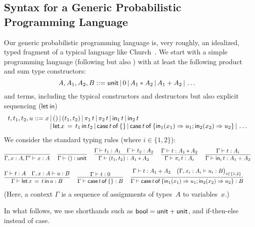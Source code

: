 \subsection{Syntax for a Generic Probabilistic Programming Language}
\label{sec:generic-ppl}
Our generic probabilistic programming language is, very roughly, an idealized,
typed fragment of a typical language like Church~\cite{goodman2008church}. 
%
We start with a simple programming language (following
\cite{s-finite,prob-cbpv,dario-thesis} but also
\cite{moggi-computational-lambda}) with at least the following product
and sum type constructors:
\[ A,A_1,A_2,B ::= \mathsf{unit} \,|\, 0\,|\, A_1 \ast A_2 \,|\, A_1+A_2\,|\, \dots 
\]
and terms, including the typical constructors and destructors but also
explicit sequencing ($\mathsf{let\,in}$)
\[\begin{array}{l@{}l}t,t_1,t_2,u ::= x &\s () \s (t_1,t_2) \s \pi_1\,t \s \pi_2\,t\s
  \inj_1\,t \s \inj_2\,t \\&\s \letin
  x {t_1} {t_2} \s\casezero t \s \case t {x_1}{u_1}{x_2}{u_2}\s \dots\end{array}
\]
We consider the standard typing rules (where $i\in\{1,2\}$):
  \begin{align*}
  &
   \infer{\Gamma, x : A, \Gamma' \vdash x : A}{} 
\ \quad   \infer{\Gamma \vdash () : \tunit}{}
  \ \quad \infer{\Gamma \vdash (t_1,t_2) : A_1 \ast A_2}{\Gamma \vdash t_1 : A_1 \quad \Gamma \vdash t_2 : A_2} 
   \ \quad \infer{\Gamma \vdash \pi_i\,t : A_i}{\Gamma \vdash t : A_1
    \ast A_2}
     \ \quad \infer{\Gamma \vdash \inj_i\,t : A_1+A_2}{\Gamma \vdash t : A_i}
   \\[6pt]
   &
     \infer{\Gamma \vdash \letin x t u : B}
     {\Gamma \vdash t : A \quad \Gamma, x : A \vdash u : B }
     \ \quad 
   \infer{\Gamma \vdash \casezero t : B}
           {\Gamma \vdash t : 0 }
     \ \quad 
   \infer{\Gamma \vdash \case t {x_1}{u_1}{x_2}{u_2}: B}
           {\Gamma \vdash t : A_1 + A_2\quad \big(\Gamma,x_i:A_i\vdash u_i:B\big)_{i\in\{1,2\}} }
  \end{align*}
  (Here, a context $\Gamma$ is a sequence of assignments of types~$A$ to variables~$x$.)

  In what follows, we use shorthands such as $\mathsf{bool}=\mathsf{unit}+\mathsf{unit}$, and
  if-then-else instead of case. 

